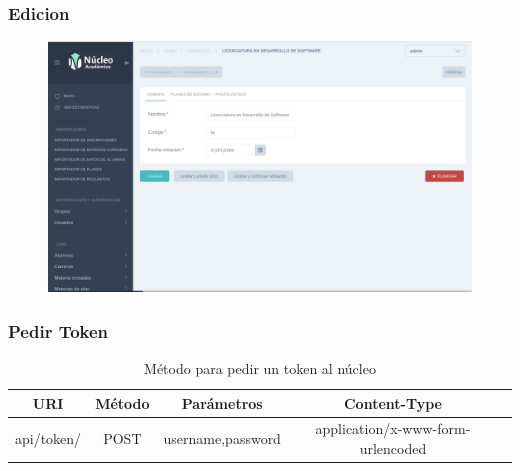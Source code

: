 \subsubsection{Edicion}
\begin{figure}[!htbp]
  \centering
    \includegraphics[scale=0.3]{images/nucleo/nucleo-edit.png}
  \label{fig:nucleo-edicion}
\end{figure}

\subsubsection{Pedir Token}
\begin{table}[!htbp]
    \centering
    \makegapedcells
    \begin{tabular}{|c|c|c|c|c|}
    \hline
    URI & Método & Parámetros & Content-Type \\ \hline
    api/token/ & POST & username,password & application/x-www-form-urlencoded \\ \hline
    \end{tabular}
    \caption{Método para pedir un token al núcleo}
    \label{tab:tabla_token}
\end{table}

